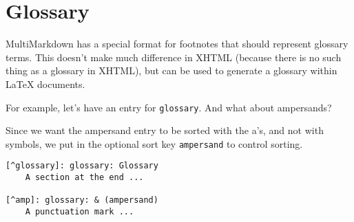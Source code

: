
\def\mytitle{MultiMarkdown Glossary Test}


\part{Glossary}
\label{glossary}

MultiMarkdown has a special format for footnotes that should represent
glossary terms. This doesn't make much difference in XHTML (because there is
no such thing as a glossary in XHTML), but can be used to generate a glossary
within LaTeX documents.

For example, let's have an entry for \texttt{glossary}. And what about
ampersands?\glsadd{& }

Since we want the ampersand entry to be sorted with the a's, and not with
symbols, we put in the optional sort key \texttt{ampersand} to control sorting.

\begin{verbatim}
[^glossary]: glossary: Glossary 
    A section at the end ...

[^amp]: glossary: & (ampersand)
    A punctuation mark ...
\end{verbatim}





